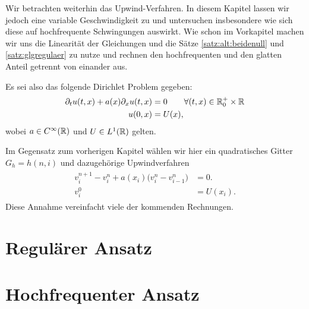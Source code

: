 
Wir betrachten weiterhin das Upwind-Verfahren.
In diesem Kapitel lassen wir jedoch eine variable Geschwindigkeit zu und untersuchen insbesondere wie sich diese auf hochfrequente Schwingungen auswirkt.
Wie schon im Vorkapitel machen wir uns die Linearität der Gleichungen und die Sätze \ref{satz:alt:beidenull} und \ref{satz:glgregulaer} zu nutze und rechnen den hochfrequenten und den glatten
Anteil getrennt von einander aus.

Es sei also das folgende Dirichlet Problem gegeben:
\begin{align}\label{eq:varadv:pde}
\begin{split}
\partial_t u(t, x) + a(x) \partial_x u(t, x) &= 0 \qquad \forall (t, x) \in \mathbb R^+_0 \times \mathbb R\\
u(0, x) &= U(x),
\end{split}
\end{align}
wobei $a \in C^\infty(\mathbb R)$ und $U \in L^1(\mathbb R)$ gelten.

Im Gegensatz zum vorherigen Kapitel wählen wir hier ein quadratisches Gitter $G_h = h (n, i)$ und dazugehörige
Upwindverfahren
\begin{align}\label{eq:varadv:verfahren}
\begin{split}
v^{n+1}_i - v^n_i + a(x_i) \bigl( v^n_i - v^n_{i-1} \bigr) &= 0.\\
v^0_i &= U(x_i).
\end{split}
\end{align}
Diese Annahme vereinfacht viele der kommenden Rechnungen.

\section{Regulärer Ansatz}



\section{Hochfrequenter Ansatz}

